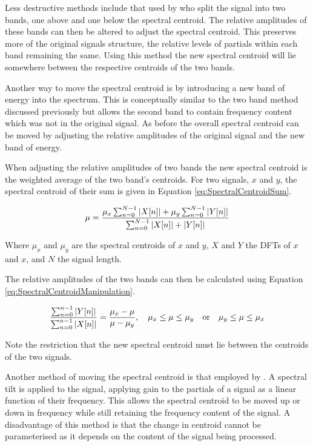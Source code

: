 		Less destructive methods include that used by \citet{zacharakis2011an} who split the signal into two bands,
		one above and one below the spectral centroid. The relative amplitudes of these bands can then be altered to
		adjust the spectral centroid. This preserves more of the original signals structure, the relative levels of
		partials within each band remaining the same. Using this method the new spectral centroid will lie somewhere
		between the respective centroids of the two bands. 

		Another way to move the spectral centroid is by introducing a new band of energy into the spectrum. This is
		conceptually similar to the two band method discussed previously but allows the second band to contain
		frequency content which was not in the original signal. As before the overall spectral centroid can be moved
		by adjusting the relative amplitudes of the original signal and the new band of energy.

		When adjusting the relative amplitudes of two bands the new spectral centroid is the weighted average of the
		two band's centroids. For two signals, $x$ and $y$, the spectral centroid of their sum is given in Equation
		\ref{eq:SpectralCentroidSum}.

		\begin{equation}
			\mu = \frac{\mu_{x}\sum_{n = 0}^{N-1} \left|X[n]\right| + \mu_{y}\sum_{n = 0}^{N-1} \left|Y[n]\right|}
			           {\sum_{n = 0}^{N-1}\left|X[n]\right| + \left|Y[n]\right|}
			\label{eq:SpectralCentroidSum}
		\end{equation}

		Where $\mu_{x}$ and $\mu_{y}$ are the spectral centroids of $x$ and $y$, $X$ and $Y$ the DFTs of $x$ and
		$x$, and $N$ the signal length.

		The relative amplitudes of the two bands can then be calculated using Equation
		\ref{eq:SpectralCentroidManipulation}.

		\begin{equation}
			\frac{\sum_{n = 0}^{n-1} \left|Y[n]\right|}{\sum_{n = 0}^{n-1} \left|X[n]\right|} = 
			\frac{\mu_{x} - \mu}{\mu - \mu_{y}}, 
			\quad \mu_{x} \leq \mu \leq \mu_{y} \quad \textrm{or} \quad \mu_{y} \leq \mu \leq \mu_{x}
			\label{eq:SpectralCentroidManipulation}
		\end{equation}

		Note the restriction that the new spectral centroid must lie between the centroids of the two signals.

		Another method of moving the spectral centroid is that employed by \citet{williams2007perceptually}. A
		spectral tilt is applied to the signal, applying gain to the partials of a signal as a linear function of
		their frequency. This allows the spectral centroid to be moved up or down in frequency while still
		retaining the frequency content of the signal. A disadvantage of this method is that the change in centroid
		cannot be parameterised as it depends on the content of the signal being processed.

